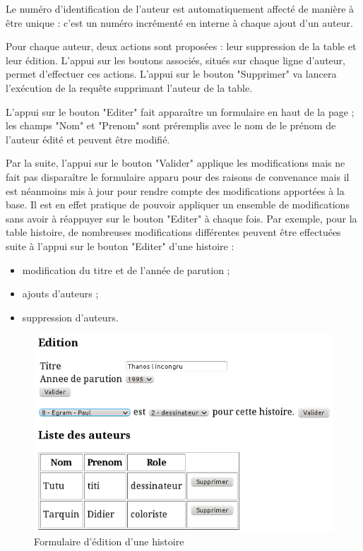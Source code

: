 \documentclass[12pt]{article}
\begin{document}
Le numéro d'identification de l'auteur est automatiquement affecté de manière
à être unique : c'est un numéro incrémenté en interne à chaque ajout d'un
auteur.

Pour chaque auteur, deux actions sont proposées : leur suppression de la table
et leur édition. L'appui sur les boutons associés, situés sur chaque ligne
d'auteur, permet d'effectuer ces actions. L'appui sur le bouton "Supprimer" va
lancera l'exécution de la requête supprimant l'auteur de la table.

L'appui sur le bouton "Editer" fait apparaître un formulaire en haut de la
page ; les champs "Nom" et "Prenom" sont préremplis avec le nom de le prénom
de l'auteur édité et peuvent être modifié.

Par la suite, l'appui sur le bouton "Valider" applique les modifications mais
ne fait pas disparaître le formulaire apparu pour des raisons de convenance
mais il est néanmoins mis à jour pour rendre compte des modifications
apportées à la base.
Il est en effet pratique de pouvoir appliquer un ensemble de modifications
sans avoir à réappuyer sur le bouton "Editer" à chaque fois.
Par exemple, pour la table histoire, de nombreuses modifications différentes
peuvent être effectuées suite à l'appui sur le bouton "Editer" d'une histoire
: 
\begin{itemize}
	\item modification du titre et de l'année de parution ;
	\item ajouts d'auteurs ;
	\item suppression d'auteurs.
\end{itemize}

\begin{figure}[h!]
\begin{center}
\noindent\includegraphics[]{formulaire-edition-histoire}
  \caption{Formulaire d'édition d'une histoire}
\end{center}
\end{figure}
\end{document}
